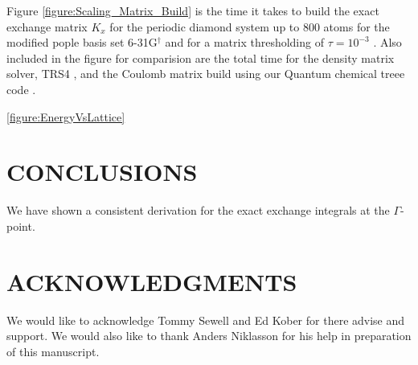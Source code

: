 \documentclass[prb,aps,nobibnotes,twocolumn,doublespace,twocolumngrid,superbib]{revtex4}
\begin{document}
Figure \ref{figure:Scaling_Matrix_Build} is the time it takes to build the
exact exchange matrix  \( K_{x} \) for the periodic diamond system up to 800 atoms for the modified pople 
basis set 6-31G$ ^\dagger$ \cite{Pople92} and for a matrix thresholding of $\tau=10^{-3}$ .
Also included in the figure for comparision are the total time for the
density matrix solver, TRS4 \cite{ANiklasson03}, 
and the Coulomb matrix build using our Quantum chemical treee code \cite{CTymczak03c}. 


\ref{figure:EnergyVsLattice}


\section{CONCLUSIONS}
We have shown a consistent derivation for the exact exchange integrals at the $\Gamma$-point. 

\section*{ACKNOWLEDGMENTS}

We would like to acknowledge Tommy Sewell and Ed Kober for there advise
and support. We would also like to thank Anders Niklasson for his help
in preparation of this manuscript. 

 
 
\end{document}
